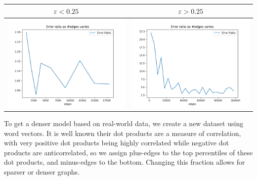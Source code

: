 \documentclass[
]{article}
\begin{document}
\begin{longtable}[]{@{}cc@{}}
\toprule()
{\(\varepsilon < 0.25\)} & {\(\varepsilon > 0.25\)} \\
\midrule()
\endhead
\includegraphics{images/error_ratio_as_edges_varies_low_epsilon.png}
&
\includegraphics{images/error_ratio_as_edges_varies_high_epsilon.png} \\
\bottomrule()
\end{longtable}

To get a denser model based on real-world data, we create a new dataset
using word vectors. It is well known their dot products are a measure of
correlation, with very positive dot products being highly correlated
while negative dot products are anticorrelated, so we assign plus-edges
to the top percentiles of these dot products, and minus-edges to the
bottom. Changing this fraction allows for sparser or denser graphs.
\end{document}
